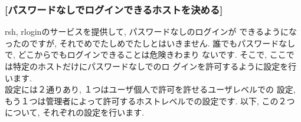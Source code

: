 \documentclass[a4paper,titlepage]{jreport}
\begin{document}
\subsubsection{[パスワードなしでログインできるホストを決める]}

          rsh, rloginのサービスを提供して, パスワードなしのログインが
          できるようになったのですが, それでめでたしめでたしとはいきません.
          誰でもパスワードなしで, どこからでもログインできることは危険きわまり
          ないです. そこで, ここでは特定のホストだけにパスワードなしでのロ
          グインを許可するように設定を行います.\\

          設定には２通りあり, １つはユーザ個人で許可を許せるユーザレベルでの
          設定, もう１つは管理者によって許可するホストレベルでの設定です.
          以下, この２つについて, それぞれの設定を行います.

\newpage
\end{document}
